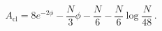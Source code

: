\begin{equation}
A_{\text{cl}} = 8 e^{-2\phi} - \frac{N}{3} \phi
- \frac{N}{6} - \frac{N}{6} \log \frac{N}{48}\, .
\end{equation}

